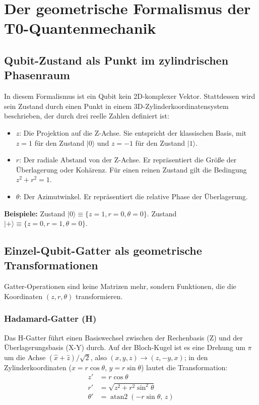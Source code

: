 	\section{Der geometrische Formalismus der T0-Quantenmechanik}
	
	\subsection{Qubit-Zustand als Punkt im zylindrischen Phasenraum}
	In diesem Formalismus ist ein Qubit kein 2D-komplexer Vektor. Stattdessen wird sein Zustand durch einen Punkt in einem 3D-Zylinderkoordinatensystem beschrieben, der durch drei reelle Zahlen definiert ist:
	\begin{itemize}
		\item $z$: Die Projektion auf die Z-Achse. Sie entspricht der klassischen Basis, mit $z=1$ für den Zustand $|0\rangle$ und $z=-1$ für den Zustand $|1\rangle$.
		\item $r$: Der radiale Abstand von der Z-Achse. Er repräsentiert die Größe der Überlagerung oder Kohärenz. Für einen reinen Zustand gilt die Bedingung $z^2 + r^2 = 1$.
		\item $\theta$: Der Azimutwinkel. Er repräsentiert die relative Phase der Überlagerung.
	\end{itemize}
	\textbf{Beispiele:} Zustand $|0\rangle \equiv \{z=1, r=0, \theta=0\}$. Zustand $|+\rangle \equiv \{z=0, r=1, \theta=0\}$.
	
	\subsection{Einzel-Qubit-Gatter als geometrische Transformationen}
	Gatter-Operationen sind keine Matrizen mehr, sondern Funktionen, die die Koordinaten $(z, r, \theta)$ transformieren.
	
	\subsubsection{Hadamard-Gatter (H)}
	Das H-Gatter führt einen Basiswechsel zwischen der Rechenbasis (Z) und der Überlagerungsbasis (X-Y) durch. Auf der Bloch-Kugel ist es eine Drehung um $\pi$ um die Achse $(\hat{x}+\hat{z})/\sqrt{2}$, also $(x,y,z) \to (z,-y,x)$; in den Zylinderkoordinaten ($x = r\cos\theta$, $y = r\sin\theta$) lautet die Transformation:
	\begin{align*}
		z' &= r \cos\theta \\
		r' &= \sqrt{z^2 + r^2 \sin^2\theta} \\
		\theta' &= \operatorname{atan2}(-r \sin\theta,\, z)
	\end{align*}
	
